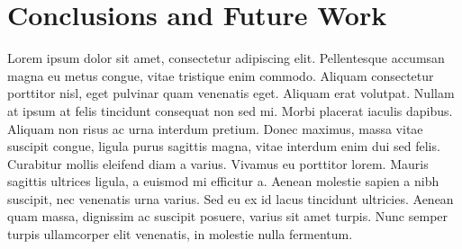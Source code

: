 \chapter{Conclusions and Future Work}

Lorem ipsum dolor sit amet, consectetur adipiscing elit. Pellentesque accumsan magna eu metus congue, vitae tristique enim commodo. Aliquam consectetur porttitor nisl, eget pulvinar quam venenatis eget. Aliquam erat volutpat. Nullam at ipsum at felis tincidunt consequat non sed mi. Morbi placerat iaculis dapibus. Aliquam non risus ac urna interdum pretium. Donec maximus, massa vitae suscipit congue, ligula purus sagittis magna, vitae interdum enim dui sed felis. Curabitur mollis eleifend diam a varius. Vivamus eu porttitor lorem. Mauris sagittis ultrices ligula, a euismod mi efficitur a. Aenean molestie sapien a nibh suscipit, nec venenatis urna varius. Sed eu ex id lacus tincidunt ultricies. Aenean quam massa, dignissim ac suscipit posuere, varius sit amet turpis. Nunc semper turpis ullamcorper elit venenatis, in molestie nulla fermentum.